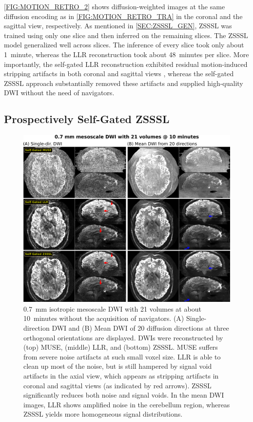 \documentclass[journal,twoside,web]{ieeecolor}
\begin{document}
	\cref{FIG:MOTION_RETRO_2} shows diffusion-weighted images
	at the same diffusion encoding as in \cref{FIG:MOTION_RETRO_TRA}
	in the coronal and the sagittal view, respectively.
	As mentioned in \cref{SEC:ZSSSL_GEN}, ZSSSL was trained using only one slice
	and then inferred on the remaining slices.
	The ZSSSL model generalized well across slices.
	The inference of every slice took only about 1~minute,
	whereas the LLR reconstruction took about 48~minutes per slice.
	More importantly, the self-gated LLR reconstruction exhibited residual
	motion-induced stripping artifacts
	in both coronal and sagittal views \cite{chang_2021_musium},
	whereas the self-gated ZSSSL approach substantially removed these artifacts
	and supplied high-quality DWI without the need of navigators.

	\subsection{Prospectively Self-Gated ZSSSL}

	\begin{figure}
		\centering
		\includegraphics[width=\textwidth]{../figures/fig4.png}
		\caption{0.7~mm isotropic mesoscale DWI with 21 volumes at about 10~minutes
			without the acquisition of navigators.
			(A) Single-direction DWI and
			(B) Mean DWI of 20 diffusion directions
			at three orthogonal orientations are displayed.
			DWIs were reconstructed by
			(top) MUSE, (middle) LLR, and (bottom) ZSSSL.
			MUSE suffers from severe noise artifacts at such small voxel size.
			LLR is able to clean up most of the noise,
			but is still hampered by signal void artifacts in the axial view,
			which appears as stripping artifacts in coronal and sagittal views
			(as indicated by red arrows).
			ZSSSL significantly reduces both noise and signal voids.
			In the mean DWI images, LLR shows amplified noise
			in the cerebellum region,
			whereas ZSSSL yields more homogeneous signal distributions.}
		\label{FIG:MOTION_PROS}
	\end{figure}
\end{document}
